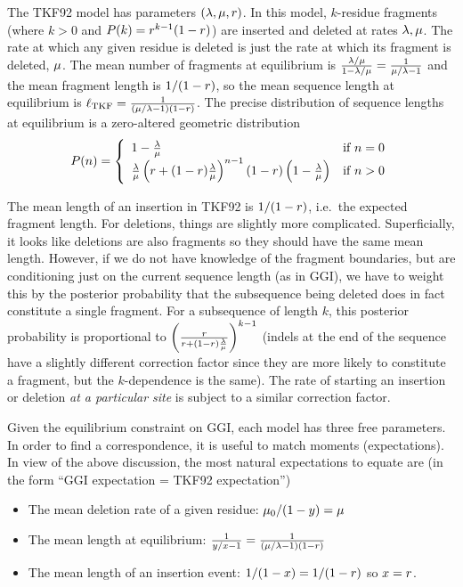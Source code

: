 The TKF92 model has parameters $(\lambda,\mu,r)$.
In this model,
$k$-residue fragments (where $k>0$ and $P(k) = r^{k-1}(1-r)$) are inserted and deleted at rates $\lambda,\mu$.
The rate at which any given residue is deleted
is just the rate at which its fragment is deleted, $\mu$.
The mean number of fragments at equilibrium is
$\frac{\lambda/\mu}{1-\lambda/\mu} = \frac{1}{\mu/\lambda - 1}$
and the mean fragment length is $1/(1-r)$,
so the mean sequence length at equilibrium is
$\ell_{\mathrm{TKF}} = \frac{1}{(\mu/\lambda - 1)(1 - r)}$.
The precise distribution of sequence lengths at equilibrium is
a zero-altered geometric distribution
\[
P(n) = \left\{
\begin{array}{ll}
1 - \frac{\lambda}{\mu} & \mbox{if $n=0$} \\
\frac{\lambda}{\mu} \left( r + (1-r)\frac{\lambda}{\mu} \right)^{n-1} (1-r) \left( 1 - \frac{\lambda}{\mu} \right) & \mbox{if $n>0$}
\end{array}
\right.
\]

The mean length of an insertion in TKF92 is $1/(1-r)$, i.e.\ the expected fragment length.
For deletions, things are slightly more complicated. Superficially,
it looks like deletions are also fragments so they should have the same mean length.
However, if we do not have knowledge of the fragment boundaries,
but are conditioning just on the current sequence length (as in GGI),
we have to weight this by the posterior probability that the subsequence being deleted does in fact constitute a single fragment.
For a subsequence of length $k$, this posterior probability is proportional to
$\left(\frac{r}{r + (1-r)\frac{\lambda}{\mu}}\right)^{k-1}$
(indels at the end of the sequence have a slightly different correction factor
since they are more likely to constitute a fragment, but the $k$-dependence is the same).
The rate of starting an insertion or deletion {\em at a particular site}
is subject to a similar correction factor.

Given the equilibrium constraint on GGI, each model has three free parameters.
In order to find a correspondence, it is useful to match moments (expectations).
In view of the above discussion, the most natural expectations to equate are
(in the form ``GGI expectation = TKF92 expectation'')
\begin{itemize}
    \item The mean deletion rate of a given residue: $\mu_0/(1-y) = \mu$
    \item The mean length at equilibrium: $\frac{1}{y/x-1} = \frac{1}{(\mu/\lambda - 1)(1 - r)}$
    \item The mean length of an insertion event: $1/(1-x) = 1/(1-r)$ so $x=r$.
\end{itemize}

